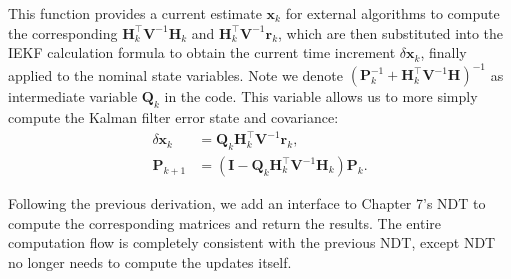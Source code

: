 This function provides a current estimate $\bm{x}_k$ for external algorithms to compute the corresponding $\bm{H}_k^\top \bm{V}^{-1} \bm{H}_k$ and $\bm{H}_k^\top \bm{V}^{-1} \bm{r}_k$, which are then substituted into the IEKF calculation formula to obtain the current time increment $\delta \bm{x}_k$, finally applied to the nominal state variables. Note we denote $(\bm{P}_k^{-1} + \bm{H}_k^\top \bm{V}^{-1} \bm{H})^{-1}$ as intermediate variable $\bm{Q}_k$ in the code. This variable allows us to more simply compute the Kalman filter error state and covariance:
\begin{align}\label{key}
	\delta \bm{x}_k &= \bm{Q}_k \bm{H}_k^\top \bm{V}^{-1} \bm{r}_k, \\
	\bm{P}_{k+1} &= (\bm{I} - \bm{Q}_k \bm{H}^\top_k \bm{V}^{-1} \bm{H}_k) \bm{P}_k.
\end{align}

Following the previous derivation, we add an interface to Chapter 7's NDT to compute the corresponding matrices and return the results. The entire computation flow is completely consistent with the previous NDT, except NDT no longer needs to compute the updates itself.

